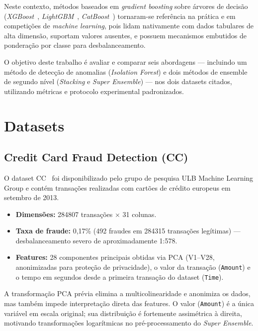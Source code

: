 \documentclass[12pt,a4paper]{article}
\newcommand{\dataset}[1]{\textsc{#1}}
\newcommand{\algo}[1]{\textit{#1}}
\begin{document}
Neste contexto, métodos baseados em \textit{gradient boosting} sobre árvores de
decisão (\algo{XGBoost}~\cite{chen2016xgboost}, \algo{LightGBM}~\cite{ke2017lightgbm},
\algo{CatBoost}~\cite{prokhorenkova2018catboost}) tornaram-se referência na
prática e em competições de \textit{machine learning}, pois lidam nativamente
com dados tabulares de alta dimensão, suportam valores ausentes, e possuem
mecanismos embutidos de ponderação por classe para desbalanceamento.

O objetivo deste trabalho é avaliar e comparar seis abordagens — incluindo um
método de detecção de anomalias (\algo{Isolation Forest}) e dois métodos de
ensemble de segundo nível (\algo{Stacking} e \algo{Super Ensemble}) — nos dois
datasets citados, utilizando métricas e protocolo experimental padronizados.

\section{Datasets}
\label{sec:datasets}

\subsection{Credit Card Fraud Detection (CC)}
\label{sec:dataset-cc}

O dataset \dataset{CC}~\cite{dal2015credit} foi disponibilizado pelo grupo de
pesquisa ULB Machine Learning Group e contém transações realizadas com cartões
de crédito europeus em setembro de 2013.

\begin{itemize}[nosep]
  \item \textbf{Dimensões:} \num{284807} transações $\times$ 31 colunas.
  \item \textbf{Taxa de fraude:} 0{,}17\% (492 fraudes em \num{284315} transações
    legítimas) — desbalanceamento severo de aproximadamente 1:578.
  \item \textbf{Features:} 28 componentes principais obtidas via PCA (V1--V28,
    anonimizadas para proteção de privacidade), o valor da transação (\texttt{Amount})
    e o tempo em segundos desde a primeira transação do dataset (\texttt{Time}).
\end{itemize}

A transformação PCA prévia elimina a multicolinearidade e anonimiza os dados,
mas também impede interpretação direta das features. O valor (\texttt{Amount})
é a única variável em escala original; sua distribuição é fortemente assimétrica
à direita, motivando transformações logarítmicas no pré-processamento do
\algo{Super Ensemble}.
\end{document}
